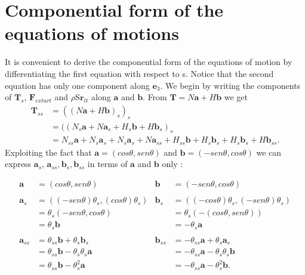 \documentclass{article}
\begin{document}
\section{Componential form of the equations of motions}\label{componential-form-of-the-equations-of-motion}

It is convenient to derive the componential form of the equations of motion by differentiating the first equation with respect to s.
Notice that the second equation has only one component along $\mathbf{e}_3$.
We begin by writing the components of $\mathbf{T}_s$, $\mathbf{F}_{extart}$ and $\rho$S$\mathbf{r}_{tt}$ along $\mathbf{a}$ and $\mathbf{b}$. From $\mathbf{T}=N\mathbf{a}+H\mathbf{b}$ we get
\begin{equation}
\begin{split}
\mathbf{T}_{ss}& =((N\mathbf{a}+H\mathbf{b})_s)_s\\
               & =((N_s\mathbf{a}+ N\mathbf{a}_s + H_s\mathbf{b} + H\mathbf{b}_s)_s\\
               & = N_{ss}\mathbf{a} + N_s\mathbf{a}_s + N_s\mathbf{a}_s + N\mathbf{a}_{ss} + H_{ss}\mathbf{b} + H_s\mathbf{b}_s + H_s\mathbf{b}_s + H\mathbf{b}_{ss}.
\end{split}
\end{equation}
Exploiting the fact that $\mathbf{a}=(cos\theta, sen\theta)$ and $\mathbf{b}=(-sen\theta, cos\theta)$ we can express $\mathbf{a}_s$, $\mathbf{a}_{ss}, \mathbf{b}_s, \mathbf{b}_{ss}$ in terms of $\mathbf{a}$ and $\mathbf{b}$ only :

\begin{align}
\mathbf{a}   & = (cos\theta,sen\theta)                        &\mathbf{b}& = (-sen\theta, cos\theta)\\\\
\mathbf{a}_s & = ((-sen\theta)\theta_s, (cos\theta)\theta_s)  &\mathbf{b}_s& = ((-cos\theta)\theta_s, (-sen\theta)\theta_s)\\
             & = \theta_s(-sen\theta, cos\theta)              & &= \theta_s(-(cos\theta, sen\theta))\\
             & =\theta_s\mathbf{b}                            & &= -\theta_s\mathbf{a}\\\\
\mathbf{a}_{ss}& = \theta_{ss}\mathbf{b}+\theta_s\mathbf{b}_s & 
\mathbf{b}_{ss}& = -\theta_{ss}\mathbf{a}+\theta_s\mathbf{a}_s\\
               & = \theta_{ss}\mathbf{b} - \theta_s\theta_s\mathbf{a} & &= -\theta_{ss}\mathbf{a} -\theta_s\theta_s\mathbf{b}\\
               & = \theta_{ss}\mathbf{b} - \theta_s^2\mathbf{a} & &= -\theta_{ss}\mathbf{a} -\theta_s^2\mathbf{b}.
\end{align}
\end{document}
